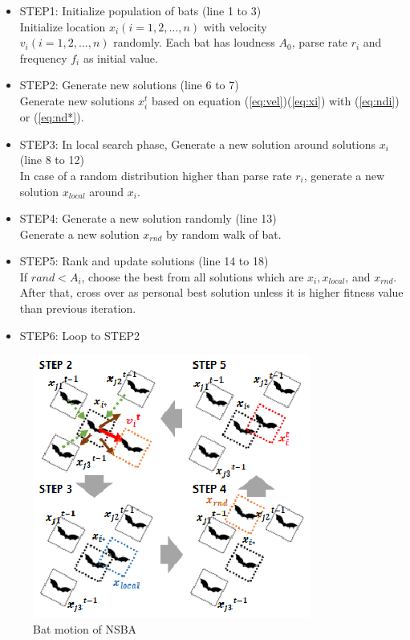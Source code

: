 \begin{itemize}
\item STEP1: Initialize population of bats (line 1 to 3)\\
Initialize location ${x_i}(i=1, 2, ..., n)$ with velocity\\ ${v_i}(i=1, 2, ..., n)$ randomly. Each bat has loudness ${A_0}$, parse rate ${r_i}$ and frequency ${f_i}$ as initial value.
\item STEP2: Generate new solutions (line 6 to 7)\\
Generate new solutions ${x_i^t}$ based on equation (\ref{eq:vel})(\ref{eq:xi}) with (\ref{eq:ndi}) or (\ref{eq:nd*}).
\item STEP3: In local search phase, Generate a new solution around solutions ${x_i}$ (line 8 to 12)\\
In case of a random distribution higher than parse rate ${r_i}$, generate a new solution ${x_{local}}$ around ${x_i}$.
\item STEP4: Generate a new solution randomly (line 13)\\
Generate a new solution ${x_{rnd}}$ by random walk of bat.  
\item STEP5: Rank and update solutions (line 14 to 18)\\
If ${rand < A_i}$, choose the best from all solutions which are ${x_i, x_{local}}$, and ${x_{rnd}}$. After that, cross over as personal best solution unless it is higher fitness value than previous iteration.  
\item STEP6: Loop to STEP2
\end{itemize}

\begin{figure}[h]
\begin{center}
\includegraphics[width=0.8\linewidth]{eps/sbat_motion.eps}
\end{center}
\caption{Bat motion of NSBA}
\label{fig:sbat}
\end{figure}

